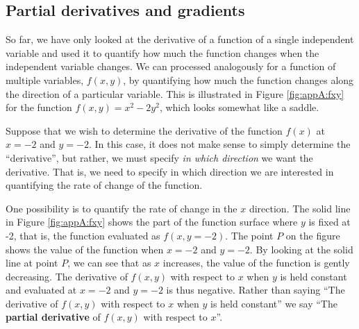 \subsection{Partial derivatives and gradients}
So far, we have only looked at the derivative of a function of a single independent variable and used it to quantify how much the function changes when the independent variable changes. We can processed analogously for a function of multiple variables, $f(x,y)$, by quantifying how much the function changes along the direction of a particular variable. This is illustrated in Figure \ref{fig:appA:fxy} for the function $f(x,y)=x^2-2y^2$, which looks somewhat like a saddle. 


Suppose that we wish to determine the derivative of the function $f(x)$ at $x=-2$ and $y=-2$. In this case, it does not make sense to simply determine the ``derivative'', but rather, we must specify \textit{in which direction} we want the derivative. That is, we need to specify in which direction we are interested in quantifying the rate of change of the function.

One possibility is to quantify the rate of change in the $x$ direction. The solid line in Figure \ref{fig:appA:fxy} shows the part of the function surface where $y$ is fixed at -2, that is, the function evaluated as $f(x,y=-2)$. The point $P$ on the figure shows the value of the function when $x=-2$ and $y=-2$. By looking at the solid line at point $P$, we can see that as $x$ increases, the value of the function is gently decreasing. The derivative of $f(x,y)$ with respect to $x$ when $y$ is held constant and evaluated at $x=-2$ and $y=-2$ is thus negative. Rather than saying ``The derivative of $f(x,y)$ with respect to $x$ when $y$ is held constant'' we say ``The \textbf{partial derivative} of $f(x,y)$ with respect to $x$''.

